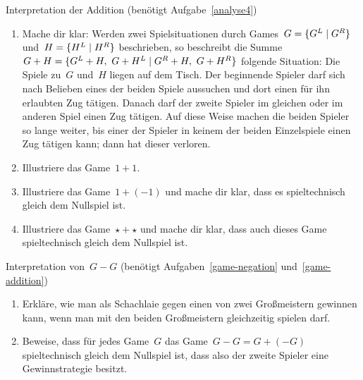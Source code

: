 \documentclass{zirkelblatt}
\begin{document}
\begin{aufgabe}{Interpretation der Addition (benötigt Aufgabe~\ref{analyse4})}
\label{game-addition}
\begin{enumerate}
\item Mache dir klar: Werden zwei Spielsituationen durch Games~$G =
\{ G^L \mathrel{|} G^R \}$ und~$H = \{ H^L \mathrel{|} H^R \}$ beschrieben, so beschreibt die Summe~$G
+ H = \{ G^L + H,\ G + H^L \mathrel{|} G^R + H,\ G + H^R \}$ folgende Situation: Die
Spiele zu~$G$ und~$H$ liegen auf dem Tisch. Der beginnende Spieler darf sich
nach Belieben eines der beiden Spiele aussuchen und dort einen für ihn
erlaubten Zug tätigen. Danach darf der zweite Spieler im gleichen oder im
anderen Spiel einen Zug tätigen. Auf diese Weise machen die beiden Spieler so
lange weiter, bis einer der Spieler in keinem der beiden Einzelspiele einen Zug
tätigen kann; dann hat dieser verloren.
\item Illustriere das Game~$1 + 1$.
\item Illustriere das Game~$1 + (-1)$ und mache dir klar, dass es
spieltechnisch gleich dem Nullspiel ist.
\item Illustriere das Game~$\star + \star$ und mache dir klar, dass auch dieses
Game spieltechnisch gleich dem Nullspiel ist.
\end{enumerate}
\end{aufgabe}

\begin{aufgabe}{Interpretation von~$G - G$ (benötigt
Aufgaben~\ref{game-negation} und~\ref{game-addition})}
\label{game-gg}
\begin{enumerate}
\item Erkläre, wie man als Schachlaie gegen einen von zwei Großmeistern
gewinnen kann, wenn man mit den beiden Großmeistern gleichzeitig spielen darf.
\item Beweise, dass für jedes Game~$G$ das Game~$G - G = G + (-G)$ spieltechnisch
gleich dem Nullspiel ist, dass also der zweite Spieler eine Gewinnstrategie
besitzt.
\end{enumerate}
\end{aufgabe}
\end{document}
